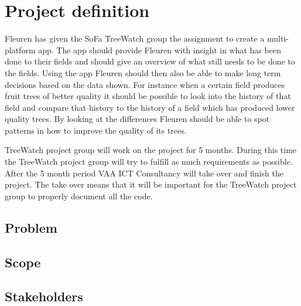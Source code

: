 
\section {Project definition}
Fleuren has given the SoFa TreeWatch group the assignment to create a multi-platform app. The app should provide Fleuren with insight in what has been done to their fields and should give an overview of what still needs to be done to the fields. Using the app Fleuren should then also be able to make long term decisions based on the data shown. For instance when a certain field produces fruit trees of better quality it should be possible to look into the history of that field and compare that history to the history of a field which has produced lower quality trees. By looking at the differences Fleuren should be able to spot patterns in how to improve the quality of its trees.

TreeWatch project group will work on the project for 5 months. During this time the TreeWatch project group will try to fulfill as much requirements as possible. After the 5 month period VAA ICT Consultancy will take over and finish the project. The take over means that it will be important for the TreeWatch project group to properly document all the code.

\subsection{Problem}

\subsection{Scope}

\subsection{Stakeholders}

